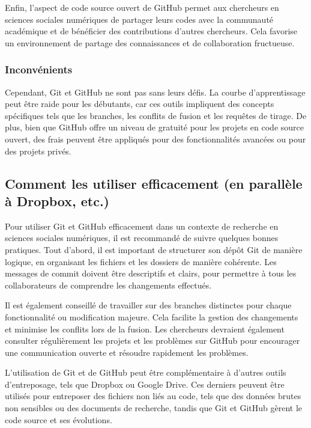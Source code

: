 \documentclass[
  letterpaper,
]{scrbook}
\begin{document}
Enfin, l'aspect de code source ouvert de GitHub permet aux chercheurs en
sciences sociales numériques de partager leurs codes avec la communauté
académique et de bénéficier des contributions d'autres chercheurs. Cela
favorise un environnement de partage des connaissances et de
collaboration fructueuse.

\hypertarget{inconvuxe9nients-1}{%
\subsubsection{Inconvénients}\label{inconvuxe9nients-1}}

Cependant, Git et GitHub ne sont pas sans leurs défis. La courbe
d'apprentissage peut être raide pour les débutants, car ces outils
impliquent des concepts spécifiques tels que les branches, les conflits
de fusion et les requêtes de tirage. De plus, bien que GitHub offre un
niveau de gratuité pour les projets en code source ouvert, des frais
peuvent être appliqués pour des fonctionnalités avancées ou pour des
projets privés.

\hypertarget{comment-les-utiliser-efficacement-en-paralluxe8le-uxe0-dropbox-etc.}{%
\subsection{Comment les utiliser efficacement (en parallèle à Dropbox,
etc.)}\label{comment-les-utiliser-efficacement-en-paralluxe8le-uxe0-dropbox-etc.}}

Pour utiliser Git et GitHub efficacement dans un contexte de recherche
en sciences sociales numériques, il est recommandé de suivre quelques
bonnes pratiques. Tout d'abord, il est important de structurer son dépôt
Git de manière logique, en organisant les fichiers et les dossiers de
manière cohérente. Les messages de commit doivent être descriptifs et
clairs, pour permettre à tous les collaborateurs de comprendre les
changements effectués.

Il est également conseillé de travailler sur des branches distinctes
pour chaque fonctionnalité ou modification majeure. Cela facilite la
gestion des changements et minimise les conflits lors de la fusion. Les
chercheurs devraient également consulter régulièrement les projets et
les problèmes sur GitHub pour encourager une communication ouverte et
résoudre rapidement les problèmes.

L'utilisation de Git et de GitHub peut être complémentaire à d'autres
outils d'entreposage, tels que Dropbox ou Google Drive. Ces derniers
peuvent être utilisés pour entreposer des fichiers non liés au code,
tels que des données brutes non sensibles ou des documents de recherche,
tandis que Git et GitHub gèrent le code source et ses évolutions.
\end{document}
